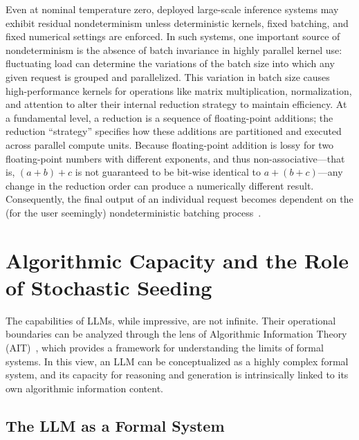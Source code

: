 \documentclass[%
  reprint,
  superscriptaddress,
  showpacs,
  showkeys,
  amsmath,amssymb,
  pra,
  longbibliography,
  floatfix,
  x11names
]{revtex4-2}
\begin{document}
Even at nominal temperature zero, deployed large-scale inference systems may exhibit residual nondeterminism unless deterministic kernels, fixed batching, and fixed numerical settings are enforced. In such systems, one important source of nondeterminism is the absence of batch invariance in highly parallel kernel use:
fluctuating load can determine the variations of the batch size into which any given request is grouped and parallelized.
 This variation in batch size causes high-performance kernels for operations like matrix multiplication, normalization,
 and attention to alter their internal reduction strategy to maintain efficiency.
At a fundamental level, a reduction is a sequence of floating-point additions; the reduction ``strategy''
specifies how these additions are partitioned and executed across parallel compute units.
Because floating-point addition is lossy for two floating-point numbers with different exponents,
and thus non-associative---that is, \((a + b) + c\) is not guaranteed to be bit-wise identical to \(a + (b + c)\)---any change in the reduction order can produce a numerically different result. Consequently, the final output of an individual request becomes dependent on the (for the user seemingly) nondeterministic batching process~\cite{he2025nondeterminism}.

\section{Algorithmic Capacity and the Role of Stochastic Seeding}
\label{section:AIT}

The capabilities of LLMs, while impressive, are not infinite.
Their operational boundaries can be analyzed through the lens of Algorithmic Information Theory (AIT)~\cite{chaitin3,calude:02},
which provides a framework for understanding the limits of formal systems.
In this view, an LLM can be conceptualized as a highly complex formal system,
and its capacity for reasoning and generation is intrinsically linked to its own algorithmic information content.

\subsection{The LLM as a Formal System}
\end{document}

